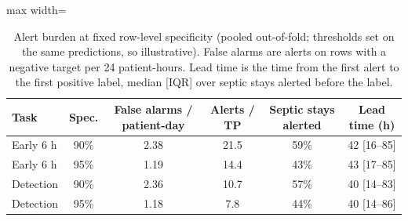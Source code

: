 \begin{table}[!t]
\centering\scriptsize
\caption{Alert burden at fixed row-level specificity (pooled out-of-fold; thresholds set on the same predictions, so illustrative). False alarms are alerts on rows with a negative target per 24 patient-hours. Lead time is the time from the first alert to the first positive label, median [IQR] over septic stays alerted before the label.}
\label{tab:burden}
\begin{adjustbox}{max width=\linewidth}
\begin{tabular}{lccccc}
\toprule
Task & Spec. & False alarms / patient-day & Alerts / TP & Septic stays alerted & Lead time (h) \\
\midrule
Early 6 h & 90\% & 2.38 & 21.5 & 59\% & 42 [16--85] \\
Early 6 h & 95\% & 1.19 & 14.4 & 43\% & 43 [17--85] \\
Detection & 90\% & 2.36 & 10.7 & 57\% & 40 [14--83] \\
Detection & 95\% & 1.18 & 7.8 & 44\% & 40 [14--86] \\
\bottomrule
\end{tabular}
\end{adjustbox}
\end{table}
